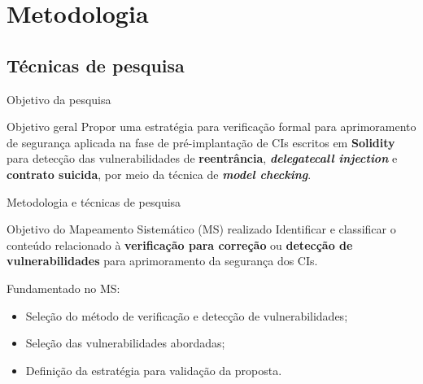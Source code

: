 \section{Metodologia}
\subsection{Técnicas de pesquisa}

\begin{frame}{Objetivo da pesquisa}
	\begin{block}{Objetivo geral}
		Propor uma estratégia para verificação formal para aprimoramento de segurança aplicada na fase de pré-implantação de CIs escritos em \textbf{Solidity} para detecção das vulnerabilidades de \textbf{reentrância}, \textbf{\textit{delegatecall injection}} e \textbf{contrato suicida}, por meio da técnica de \textbf{\textit{model checking}}.
	\end{block}
\end{frame}

\begin{frame}{Metodologia e técnicas de pesquisa}
    \begin{block}{Objetivo do Mapeamento Sistemático (MS) realizado}
    Identificar e classificar o conteúdo relacionado à \textbf{verificação para correção} ou \textbf{detecção de vulnerabilidades} para aprimoramento da segurança dos CIs.
    \end{block}
    Fundamentado no MS:
    \begin{itemize}
        \item Seleção do método de verificação e detecção de vulnerabilidades;
        \item Seleção das vulnerabilidades abordadas;
        \item Definição da estratégia para validação da proposta. 
    \end{itemize}
\end{frame}


